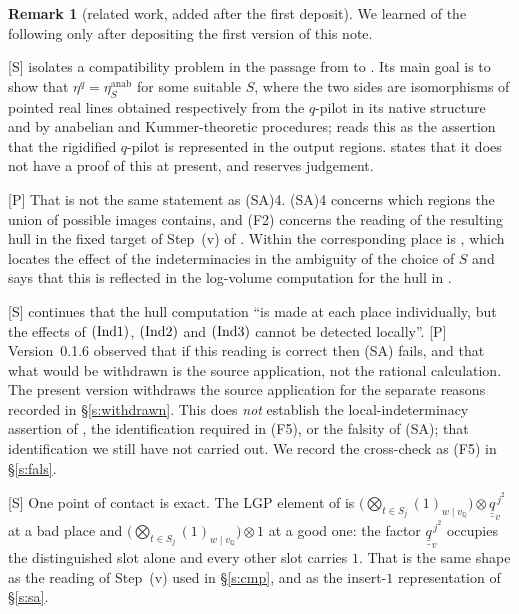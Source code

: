 \documentclass[11pt]{article}
\theoremstyle{plain}
\theoremstyle{definition}
\newtheorem{remark}{Remark}
\newcommand{\Ind}[1]{\textup{(Ind#1)}}
\newcommand{\SA}{\textup{(SA)}}
\begin{document}
\begin{remark}[related work, added after the first deposit]\label{r:lana}
We learned of the following only after depositing the first version of this note.

\textup{[S]} \cite{LANA} isolates a compatibility problem in the passage from
\cite[Thm.~3.11]{IUT3} to \cite[Cor.~3.12]{IUT3}.  Its main goal
\cite[\S9.2]{LANA} is to show that $\eta^{q}=\eta^{\mathrm{anab}}_{S}$ for some
suitable $S$, where the two sides are isomorphisms of pointed real lines obtained
respectively from the $q$-pilot in its native structure and by anabelian and
Kummer-theoretic procedures; \cite[\S9.3]{LANA} reads this as the assertion that
the rigidified $q$-pilot is represented in the output regions.  \cite{LANA} states
that it does not have a proof of this at present, and reserves judgement.

\textup{[P]} That is not the same statement as \SA4.  \SA4 concerns which regions
the union of possible images contains, and \textup{(F2)} concerns the reading of
the resulting hull in the fixed target of Step~(v) of \cite[Thm.~1.10]{IUT4}.
Within \cite{LANA} the corresponding place is \cite[\S10.4]{LANA}, which locates
the effect of the indeterminacies in the ambiguity of the choice of $S$ and says
that this is reflected in the log-volume computation for the hull in
\cite{IUT4}.

\textup{[S]} \cite[\S10.4]{LANA} continues that the hull computation ``is made
at each place individually, but the effects of $\Ind1$, $\Ind2$ and $\Ind3$ cannot
be detected locally''.  \textup{[P]} Version~0.1.6 observed that if this reading is correct then \SA{}
fails, and that what would be withdrawn is the source application, not the
rational calculation.  The present version withdraws the source application for
the separate reasons recorded in \S\ref{s:withdrawn}.  This does \emph{not}
establish the local-indeterminacy assertion of \cite{LANA}, the identification
required in \textup{(F5)}, or the falsity of \SA{}; that identification we still
have not carried out.
We record the cross-check as \textup{(F5)} in \S\ref{s:fals}.

\textup{[S]} One point of contact is exact.  The LGP element of
\cite[\S5.2(f)]{LANA} is
$\bigl(\bigotimes_{t\in S_j}(1)_{w\mid v_{\mathbb Q}}\bigr)\otimes
\underline{\underline q}_v^{\,j^2}$ at a bad place and $\bigl(\bigotimes_{t\in S_j}(1)_{w\mid v_{\mathbb Q}}\bigr)\otimes1$
at a good one: the factor $\underline{\underline q}_v^{\,j^2}$ occupies the distinguished slot alone and
every other slot carries $1$.  That is the same shape as the reading of Step~(v)
used in \S\ref{s:cmp}, and as the insert-$1$ representation of \S\ref{s:sa}.


\end{remark}
\end{document}
